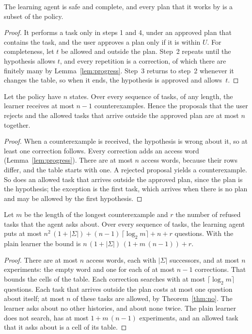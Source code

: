 \documentclass[acmsmall,nonacm,screen]{acmart}
\begin{document}
\begin{theorem}
\label{thm:safe}
The learning agent is safe and complete, and every plan that it works by is a subset of the
policy.
\end{theorem}

\begin{proof}
It performs a task only in steps 1 and 4, under an approved plan that contains the task, and
the user approves a plan only if it is within $U$. For completeness, let $t$ be allowed and
outside the plan. Step~2 repeats until the hypothesis allows $t$, and every repetition is a
correction, of which there are finitely many by Lemma~\ref{lem:progress}. Step~3 returns to
step~2 whenever it changes the table, so when it ends, the hypothesis is approved and
allows~$t$.
\end{proof}

\begin{theorem}
\label{thm:no}
Let the policy have $n$ states. Over every sequence of tasks, of any length, the learner
receives at most $n - 1$ counterexamples. Hence the proposals that the user rejects and the
allowed tasks that arrive outside the approved plan are at most $n$ together.
\end{theorem}

\begin{proof}
When a counterexample is received, the hypothesis is wrong about it, so at least one
correction follows. Every correction adds an access word (Lemma~\ref{lem:progress}). There
are at most $n$ access words, because their rows differ, and the table starts with one. A
rejected proposal yields a counterexample. So does an allowed task that arrives outside the
approved plan, since the plan is the hypothesis; the exception is the first task, which
arrives when there is no plan and may be allowed by the first hypothesis.
\end{proof}

\begin{theorem}[Questions]
\label{thm:asks}
Let $m$ be the length of the longest counterexample and $r$ the number of refused tasks that
the agent asks about. Over every sequence of tasks, the learning agent puts at most
$n^2\,(1 + |\Sigma|) + (n - 1)\,\lceil \log_2 m \rceil + n + r$ questions. With the plain
learner the bound is $n\,(1 + |\Sigma|)\,(1 + m\,(n - 1)) + r$.
\end{theorem}

\begin{proof}
There are at most $n$ access words, each with $|\Sigma|$ successors, and at most $n$
experiments: the empty word and one for each of at most $n - 1$ corrections. That bounds
the cells of the table. Each correction searches with at most $\lceil \log_2 m \rceil$
questions. Each task that arrives outside the plan costs at most one question about itself;
at most $n$ of these tasks are allowed, by Theorem~\ref{thm:no}. The learner asks about no
other histories, and about none twice. The plain learner does not search, has at most
$1 + m\,(n - 1)$ experiments, and an allowed task that it asks about is a cell of its
table.
\end{proof}
\end{document}
